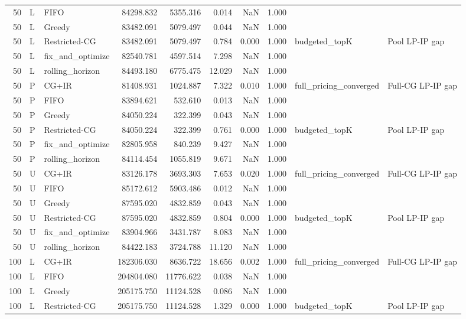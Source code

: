 \begin{tabular}{rllrrrrrll}
50 & L & FIFO & 84298.832 & 5355.316 & 0.014 & NaN & 1.000 &  &  \\
50 & L & Greedy & 83482.091 & 5079.497 & 0.044 & NaN & 1.000 &  &  \\
50 & L & Restricted-CG & 83482.091 & 5079.497 & 0.784 & 0.000 & 1.000 & budgeted_topK & Pool LP-IP gap \\
50 & L & fix_and_optimize & 82540.781 & 4597.514 & 7.298 & NaN & 1.000 &  &  \\
50 & L & rolling_horizon & 84493.180 & 6775.475 & 12.029 & NaN & 1.000 &  &  \\
50 & P & CG+IR & 81408.931 & 1024.887 & 7.322 & 0.010 & 1.000 & full_pricing_converged & Full-CG LP-IP gap \\
50 & P & FIFO & 83894.621 & 532.610 & 0.013 & NaN & 1.000 &  &  \\
50 & P & Greedy & 84050.224 & 322.399 & 0.043 & NaN & 1.000 &  &  \\
50 & P & Restricted-CG & 84050.224 & 322.399 & 0.761 & 0.000 & 1.000 & budgeted_topK & Pool LP-IP gap \\
50 & P & fix_and_optimize & 82805.958 & 840.239 & 9.427 & NaN & 1.000 &  &  \\
50 & P & rolling_horizon & 84114.454 & 1055.819 & 9.671 & NaN & 1.000 &  &  \\
50 & U & CG+IR & 83126.178 & 3693.303 & 7.653 & 0.020 & 1.000 & full_pricing_converged & Full-CG LP-IP gap \\
50 & U & FIFO & 85172.612 & 5903.486 & 0.012 & NaN & 1.000 &  &  \\
50 & U & Greedy & 87595.020 & 4832.859 & 0.043 & NaN & 1.000 &  &  \\
50 & U & Restricted-CG & 87595.020 & 4832.859 & 0.804 & 0.000 & 1.000 & budgeted_topK & Pool LP-IP gap \\
50 & U & fix_and_optimize & 83904.966 & 3431.787 & 8.083 & NaN & 1.000 &  &  \\
50 & U & rolling_horizon & 84422.183 & 3724.788 & 11.120 & NaN & 1.000 &  &  \\
100 & L & CG+IR & 182306.030 & 8636.722 & 18.656 & 0.002 & 1.000 & full_pricing_converged & Full-CG LP-IP gap \\
100 & L & FIFO & 204804.080 & 11776.622 & 0.038 & NaN & 1.000 &  &  \\
100 & L & Greedy & 205175.750 & 11124.528 & 0.086 & NaN & 1.000 &  &  \\
100 & L & Restricted-CG & 205175.750 & 11124.528 & 1.329 & 0.000 & 1.000 & budgeted_topK & Pool LP-IP gap \\

\end{tabular}
